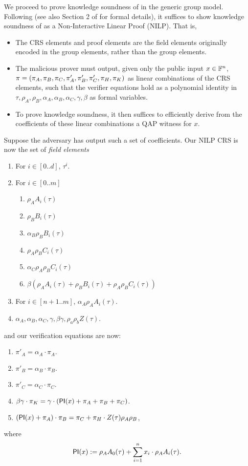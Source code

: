 \documentclass[11pt]{article}
\numberwithin{equation}{section} %
\numberwithin{figure}{section} %
\begin{document}
We proceed to prove knowledge soundness of \bctvprime in the generic group model.
Following \cite{groth16} (see also Section 2 of \cite{segroth} for formal details), it suffices to show knowledge
soundness of \bctvprime as a Non-Interactive Linear Proof (NILP). That is, 
\begin{itemize}
\item The CRS elements and proof elements are the field elements originally encoded in the group elements, rather than the group elements.
\item The malicious prover must output, given only the public input $x\in\mathbb F^n$, $\pi = (\pi_A,\pi_B,\pi_C,\pi'_A,\pi'_B,\pi'_C,\pi_H,\pi_K)$ as linear combinations of the CRS elements, such that the verifier equations hold as a polynomial identity in 
$\tau,\rho_A,\rho_B,\alpha_A,\alpha_B,\alpha_C,\gamma,\beta$ as formal variables.
\item To prove knowledge soundness, it then suffices to efficiently derive from the coefficients of these linear combinations a QAP witness for $x$.
\end{itemize}

Suppose the adversary has output such a set of coefficients.
Our NILP CRS is now the set of \emph{field elements}

\begin{enumerate}
 \item For $i\in [0..d]$, $\tau^i$.
 \item For $i\in [0..m]$ 
 
 \begin{enumerate}
  \item $\rho_A A_i(\tau)$
\item $\rho_B B_i(\tau)$
\item $\alpha_B\rho_B B_i(\tau)$
\item $\rho_A\rho_B C_i(\tau)$
\item $\alpha_C \rho_A\rho_B C_i(\tau)$ 
\item $\beta(\rho_A A_i(\tau) + \rho_B B_i(\tau) + \rho_A\rho_B C_i(\tau))$ 
\end{enumerate}
\item For $i\in [n+1..m]$, $\alpha_A\rho_A A_i(\tau)$.

\item $\alpha_A,\alpha_B,\alpha_C,\gamma,\beta\gamma,\rho_a\rho_b Z(\tau)$.
\end{enumerate}

and our verification equations are now:
\begin{enumerate}
 \item $\pi'_A= \alpha_A\cdot \pi_A$.
\item $\pi'_B=\alpha_B\cdot \pi_B$.
\item $\pi'_C=\alpha_C\cdot \pi_C$.
\item $\beta\gamma\cdot \pi_K =\gamma\cdot (\mathsf{PI}(x)+\pi_A+\pi_B+\pi_C)$.
\item $(\mathsf{PI}(x)+\pi_A)\cdot \pi_B= \pi_C + \pi_H\cdot Z(\tau)\rho_A\rho_B$,
 \end{enumerate}
where
\[\mathsf{PI}(x):= \rho_A A_0(\tau) + \sum_{i=1}^n x_i\cdot \rho_A A_i(\tau) .\]
 
\end{document}
